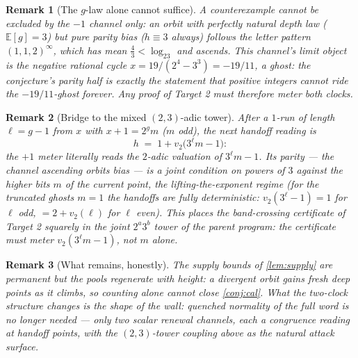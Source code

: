 \documentclass[11pt]{article}
\newtheorem*{remark}{Remark}
\newcommand{\vt}{v_2}
\begin{document}
\begin{remark}[The $g$-law alone cannot suffice]
A counterexample cannot be excluded by the $-1$ channel only: an orbit
with perfectly natural depth law ($\mathbb E[g]=3$) but pure parity
bias ($h\equiv3$ always) follows the letter pattern $(1,1,2)^\infty$,
which has mean $\tfrac43<\log_23$ and ascends. This channel's limit
object is the \emph{negative rational cycle}
$x=19/(2^4-3^3)=-19/11$, a ghost: the conjecture's parity half is
exactly the statement that positive integers cannot ride the
$-19/11$-ghost forever. Any proof of Target 2 must therefore meter
both clocks.
\end{remark}

\begin{remark}[Bridge to the mixed $(2,3)$-adic tower]
After a $1$-run of length $\ell=g-1$ from $x$ with $x+1=2^g m$ ($m$
odd), the next handoff reading is
\[
h \;=\; 1+\vt\bigl(3^{\ell}m-1\bigr):
\]
the $+1$ meter literally reads the $2$-adic valuation of
$3^{\ell}m-1$. Its parity --- the channel ascending orbits bias --- is a
joint condition on powers of $3$ against the \emph{higher} bits $m$ of
the current point, the lifting-the-exponent regime (for the truncated
ghosts $m=1$ the handoffs are fully deterministic:
$\vt(3^\ell-1)=1$ for $\ell$ odd, $=2+\vt(\ell)$ for $\ell$ even).
This places the band-crossing certificate of Target 2 squarely in the
joint $2^a3^b$ tower of the parent program: the certificate must meter
$\vt(3^\ell m-1)$, not $m$ alone.
\end{remark}

\begin{remark}[What remains, honestly]
The supply bounds of \cref{lem:supply} are permanent but the pools
regenerate with height: a divergent orbit gains fresh deep points as
it climbs, so counting alone cannot close \cref{conj:cal}. What the
two-clock structure changes is the \emph{shape} of the wall: quenched
normality of the full word is no longer needed --- only two scalar
renewal channels, each a congruence reading at handoff points, with
the $(2,3)$-tower coupling above as the natural attack surface.
\end{remark}
\end{document}
